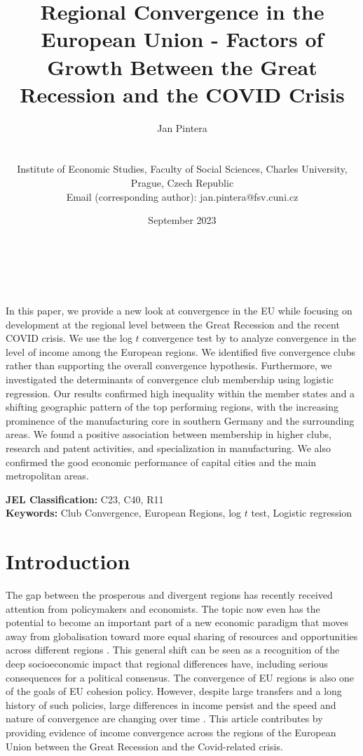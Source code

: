 \documentclass[11pt]{article}
\title{\large Regional Convergence in the European Union - Factors of Growth Between the Great Recession and the COVID Crisis}
\author{
        \begin{large}Jan Pintera\end{large} \\\vspace{5mm} \begin{small} Institute of Economic Studies, Faculty of Social Sciences, Charles University,\\ Prague, Czech Republic\\
        Email (corresponding author): jan.pintera@fsv.cuni.cz 
        \end{small}
}
\date{September 2023}
\makeatletter
\renewcommand{\maketitle}{\bgroup\setlength{\parindent}{0pt}
\begin{flushright}
  \textbf{\@title}\\
  \vspace{5mm}
  \@author\\
  \vspace{5mm}
  \@date
\end{flushright}\egroup
}
\renewenvironment{abstract}
 {\small
  \begin{flushleft}
  \bfseries \abstractname\vspace{-.5em}\vspace{0pt}
  \end{flushleft}
  \list{}{%
    \setlength{\leftmargin}{0mm}%
    \setlength{\rightmargin}{\leftmargin}%
  }%
  \item\relax}
 {\endlist}
\def \Keywords {Club Convergence, European Regions, log $t$ test, Logistic regression}
\makeatother
\begin{document}
\maketitle


\thispagestyle{empty}
\begin{abstract}
In this paper, we provide a new look at convergence in the EU while focusing on development at the regional level between the Great Recession and the recent COVID crisis. We use the log $t$ convergence test by \citet{phillips2007transition} to analyze convergence in the level of income among the European regions. We identified five convergence clubs rather than supporting the overall convergence hypothesis. Furthermore, we investigated the determinants of convergence club membership using logistic regression. Our results confirmed high inequality within the member states and a shifting geographic pattern of the top performing regions, with the increasing prominence of the manufacturing core in southern Germany and the surrounding areas. We found a positive association between membership in higher clubs, research and patent activities, and specialization in manufacturing. We also confirmed the good economic performance of capital cities and the main metropolitan areas.

\bigskip


\textbf{JEL Classification:} C23, C40, R11 \\
\textbf{Keywords:}  \Keywords \\

\bigskip

\end{abstract}
\clearpage
\setcounter{page}{1}

\section{Introduction}
The gap between the prosperous and divergent regions has recently received attention from policymakers and economists. The topic now even has the potential to become an important part of a new economic paradigm that moves away from globalisation toward more equal sharing of resources and opportunities across different regions \citep{rodrik_2022}. This general shift can be seen as a recognition of the deep socioeconomic impact that regional differences have, including serious consequences for a political consensus. The convergence of EU regions is also one of the goals of EU cohesion policy. However, despite large transfers and a long history of such policies, large differences in income persist and the speed and nature of convergence are changing over time \citep{eckey2007convergence,zarotiadis2013european, iammarino2019regional}.
This article contributes by providing evidence of income convergence across the regions of the European Union between the Great Recession and the Covid-related crisis.
\end{document}
